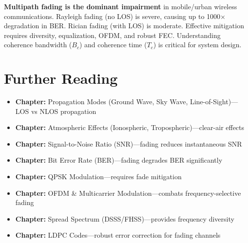 \begin{keyconcept}
\textbf{Multipath fading is the dominant impairment} in mobile/urban wireless communications. Rayleigh fading (no LOS) is severe, causing up to 1000$\times$ degradation in BER. Rician fading (with LOS) is moderate. Effective mitigation requires diversity, equalization, OFDM, and robust FEC. Understanding coherence bandwidth ($B_c$) and coherence time ($T_c$) is critical for system design.
\end{keyconcept}

\section{Further Reading}

\begin{itemize}
\item \textbf{Chapter:} Propagation Modes (Ground Wave, Sky Wave, Line-of-Sight)---LOS vs NLOS propagation
\item \textbf{Chapter:} Atmospheric Effects (Ionospheric, Tropospheric)---clear-air effects
\item \textbf{Chapter:} Signal-to-Noise Ratio (SNR)---fading reduces instantaneous SNR
\item \textbf{Chapter:} Bit Error Rate (BER)---fading degrades BER significantly
\item \textbf{Chapter:} QPSK Modulation---requires fade mitigation
\item \textbf{Chapter:} OFDM \& Multicarrier Modulation---combats frequency-selective fading
\item \textbf{Chapter:} Spread Spectrum (DSSS/FHSS)---provides frequency diversity
\item \textbf{Chapter:} LDPC Codes---robust error correction for fading channels
\end{itemize}
